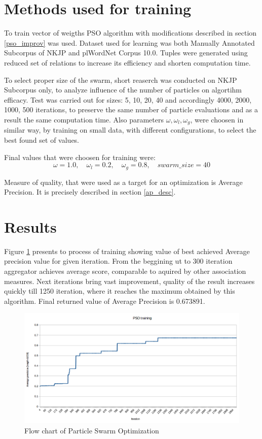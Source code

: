\section{Methods used for training}
To train vector of weigths PSO algorithm with modifications described in section \ref{pso_improv} was used. 
Dataset used for learning was both Manually Annotated Subcorpus of NKJP and plWordNet Corpus 10.0. Tuples were generated using reduced set of relations
to increase its efficiency and shorten computation time.

To select proper size of the swarm, short reaserch was conducted on NKJP Subcorpus only, to analyze influence of the number of particles on 
algortihm efficacy. Test was carried out for sizes: 5, 10, 20, 40 and accordingly 4000, 2000, 1000, 500 iterations, 
to preserve the same number of particle evaluations and as a result the same computation time.
Also parameters \(\omega, \omega _l, \omega _g\), were choosen in similar way, by training on small data, with different configurations, 
to select the best found set of values.

Final values that were choosen for training were: \\
\[
\omega = 1.0, \quad
\omega _l = 0.2, \quad
\omega _g = 0.8, \quad
swarm\_size = 40
\]

Measure of quality, that were used as a target for an optimization is Average Precision. It is precisely described in section \ref{ap_desc}.

\section{Results}
Figure \ref{pso_train} presents to process of training showing value of best achieved Average precision value for given iteration.
From the beggining ut to 300 iteration aggregator achieves average score, comparable to aquired by other association measures. 
Next iterations bring vast improvement, quality of the result increases quickly till 1250 iteration, where it reaches the maximum 
obtained by this algorithm. Final returned value of Average Precision is 0.673891.


\begin{figure}[ht]
    \centering
    \includegraphics[scale=0.45]{img/pso_train.png}
    \caption{Flow chart of Particle Swarm Optimization}
    \label{pso_train}
\end{figure}